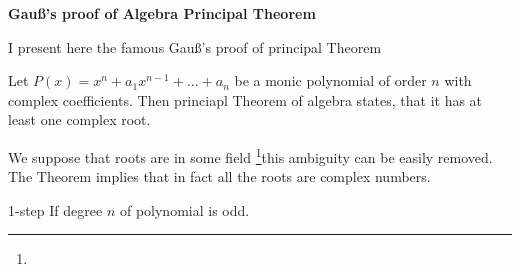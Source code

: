 




\def\V {{\cal V}}
\def\s {{\sigma}}
\def\Q {{\bf Q}}
\def\D {{\cal D}}
\def\G {{\Gamma}}
\def\C {{\bf C}}
\def\M {{\cal M}}
\def\Z {{\bf Z}}
\def\U  {{\cal U}}
\def\H {{\cal H}}
\def\F {{\cal F}}
\def\grad {{^{\circ}}}
\def\S {{\Sigma}}
\def\s {{\sigma}}


   \centerline{\bf Gau\ss's proof of Algebra 
Principal Theorem}

 {\rm I present here the famous Gau\ss's proof of
  principal Theorem}

Let $P(x)=x^n+a_1x^{n-1}+\dots+a_n$ be a monic polynomial
of order $n$ with complex coefficients. Then princiapl 
Theorem of algebra states, that it has at least 
one complex root.

 We suppose that roots are in some field
\footnote{}{this ambiguity can be easily removed}.
The Theorem implies  that in fact all the 
roots are complex
numbers. 


1-step If degree $n$ of polynomial is odd.
\bye
